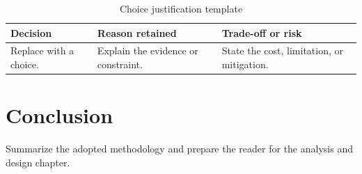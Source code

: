 \begin{table}[H]
    \centering
    \caption{Choice justification template}
    \label{tab:choice-justification-template}
    \small
    \begin{tabular}{L{0.24\textwidth}L{0.30\textwidth}L{0.30\textwidth}}
        \toprule
        \textbf{Decision} & \textbf{Reason retained} & \textbf{Trade-off or risk} \\
        \midrule
        Replace with a choice. & Explain the evidence or constraint. & State the cost, limitation, or mitigation. \\
        \bottomrule
    \end{tabular}
\end{table}

\section{Conclusion}
Summarize the adopted methodology and prepare the reader for the analysis and design chapter.